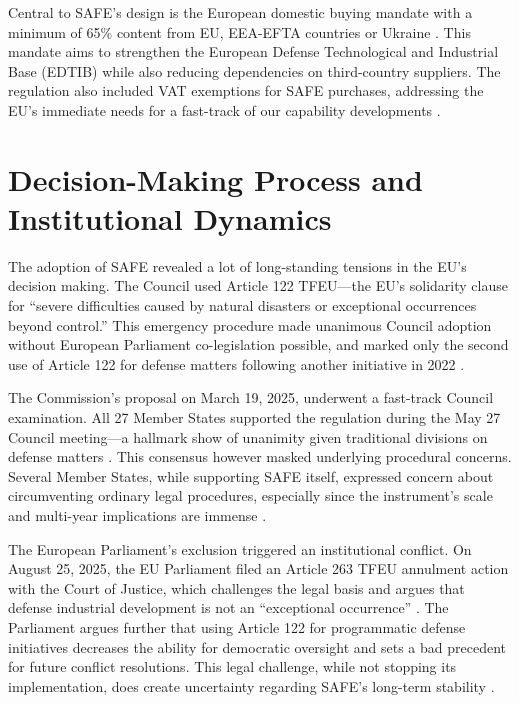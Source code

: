 \documentclass[12pt,a4paper]{article}
\begin{document}
\noindent Central to SAFE's design is the European domestic buying mandate with a minimum of 65\% content from EU, EEA-EFTA countries or Ukraine \parencite{commission2025proposal}. This mandate aims to strengthen the European Defense Technological and Industrial Base (EDTIB) while also reducing dependencies on third-country suppliers. The regulation also included VAT exemptions for SAFE purchases, addressing the EU’s immediate needs for a fast-track of our capability developments \parencite{commission2025proposal}.

\section*{Decision-Making Process and Institutional Dynamics}
\noindent The adoption of SAFE revealed a lot of long-standing tensions in the EU's decision making. The Council used Article 122 TFEU---the EU’s solidarity clause for ``severe difficulties caused by natural disasters or exceptional occurrences beyond control.'' This emergency procedure made unanimous Council adoption without European Parliament co-legislation possible, and marked only the second use of Article 122 for defense matters following another initiative in 2022 \parencite{verfassungsblog2025}.

\noindent The Commission's proposal on March 19, 2025, underwent a fast-track Council examination. All 27 Member States supported the regulation during the May 27 Council meeting---a hallmark show of unanimity given traditional divisions on defense matters \parencite{council2025safe,commission2025proposal}. This consensus however masked underlying procedural concerns. Several Member States, while supporting SAFE itself, expressed concern about circumventing ordinary legal procedures, especially since the instrument's scale and multi-year implications are immense \parencite{verfassungsblog2025}.

\noindent The European Parliament's exclusion triggered an institutional conflict. On August 25, 2025, the EU Parliament filed an Article 263 TFEU annulment action with the Court of Justice, which challenges the legal basis and argues that defense industrial development is not an ``exceptional occurrence'' \parencite{eunews2025parliament}. The Parliament argues further that using Article 122 for programmatic defense initiatives decreases the ability for democratic oversight and sets a bad precedent for future conflict resolutions. This legal challenge, while not stopping its implementation, does create uncertainty regarding SAFE's long-term stability \parencite{eunews2025parliament}.
\end{document}
